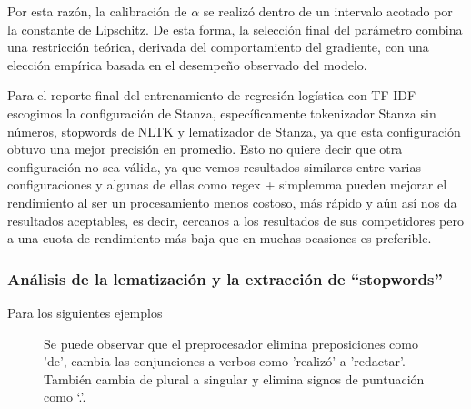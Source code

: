 \documentclass[12pt]{article}
\begin{document}
Por esta razón, la calibración de $\alpha$ se realizó dentro de un intervalo acotado por la constante de Lipschitz. De esta forma, la selección final del parámetro combina una restricción teórica, derivada del comportamiento del gradiente, con una elección empírica basada en el desempeño observado del modelo.

Para el reporte final del entrenamiento de regresión logística con TF-IDF escogimos la configuración de Stanza, específicamente tokenizador Stanza sin números, stopwords de NLTK y lematizador de Stanza, ya que esta configuración obtuvo una mejor precisión en promedio. Esto no quiere decir que otra configuración no sea válida, ya que vemos resultados similares entre varias configuraciones y algunas de ellas como regex + simplemma pueden mejorar el rendimiento al ser un procesamiento menos costoso, más rápido y aún así nos da resultados aceptables, es decir, cercanos a los resultados de sus competidores pero a una cuota de rendimiento más baja que en muchas ocasiones es preferible. \\

\subsubsection{Análisis de la lematización y la extracción de ``stopwords''}

Para los siguientes ejemplos

\begin{figure}[H]
\centering
\begin{subfigure}{0.48\textwidth}
\end{subfigure}
\begin{subfigure}{0.48\textwidth}
\end{subfigure}
\caption{Se puede observar que el preprocesador elimina preposiciones como 'de', cambia las conjunciones a verbos como 'realizó' a 'redactar'. También cambia de plural a singular y elimina signos de puntuación como `.'. }
\end{figure}
\end{document}
